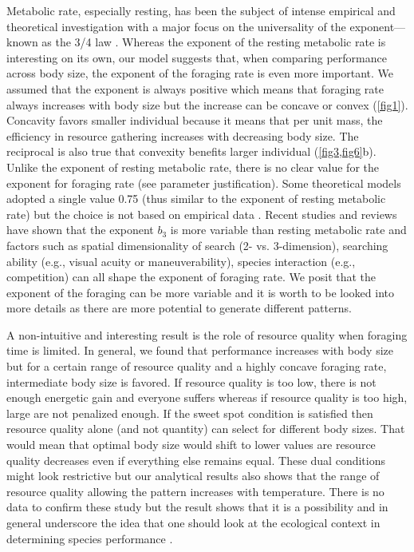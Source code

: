 Metabolic rate, especially resting, has been the subject of intense empirical and theoretical investigation with a major focus on  the universality of the exponent---known as the 3/4 law \citep{Peters1986,West1997, Kozlowski1997, Brown2004, Isaac2010}. 
Whereas the exponent of the resting metabolic rate is interesting on its own, our model suggests that, when comparing performance across body size, the exponent of the foraging rate is even more important.
We assumed that the exponent is always positive which means that foraging rate always increases with body size but the increase can be concave or convex (\cref{fig1}).
Concavity favors smaller individual because it means that per unit mass, the efficiency in resource gathering increases with decreasing body size.
The reciprocal is also true that convexity benefits larger individual (\cref{fig3,fig6}b).
Unlike the exponent of resting metabolic rate, there is no clear value for the exponent for foraging rate (see parameter justification).
Some theoretical models adopted a single value 0.75 (thus similar to the exponent of resting metabolic rate) but the choice is not based on empirical data \citep{Yodzis1992, Brown1993}.
Recent studies and reviews have shown that the exponent $b_3$  is more variable than resting metabolic rate and factors such as spatial dimensionality of search (2- vs. 3-dimension), searching ability (e.g., visual acuity or maneuverability),  species interaction (e.g., competition) can all shape the exponent of foraging rate\citep{Pawar2012, Kalinkat2015}.
We posit that the exponent of the foraging can be more variable and it is worth to be looked into more details as there are more potential to generate different patterns.

A non-intuitive and interesting result is the role of resource quality when foraging time is limited.
In general, we found that performance increases with body size but for a certain range of resource quality and a highly concave foraging rate, intermediate body size is favored.
If resource quality is too low, there is not enough energetic gain and everyone suffers whereas if resource quality is too high, large are not penalized enough.
If the sweet spot condition is satisfied then resource quality alone (and not quantity) can select for different body sizes.
That would mean that optimal body size would shift to lower values are resource quality decreases even if everything else remains equal.
These dual conditions might look restrictive but our analytical results also shows that the range of resource quality allowing the pattern increases with temperature. 
There is no data to confirm these study but the result shows that it is a possibility and in general underscore the idea that one should look at the ecological context in determining species performance \citep{Sears2015}.

